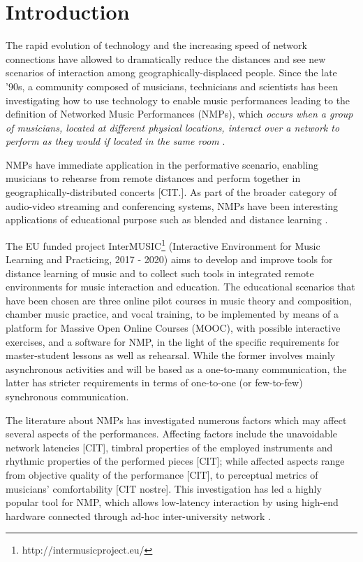 
\section{Introduction}\label{sec:introduction}

The rapid evolution of technology and the increasing speed of network connections have allowed to dramatically reduce the distances and see new scenarios of interaction among geogra\-phically-displaced people. Since the late '90s, a community composed of musicians, technicians and  scientists has been investigating how to use technology to enable music performances leading to the definition of Networked Music Performances (NMPs), which \textit{occurs when a group of musicians, located at different physical locations, interact over a network to perform as they would if located in the same room} \cite{Lazzaro2001}.

NMPs have immediate application in the performative scenario, enabling musicians to rehearse from remote distances and perform together in geographically-distributed concerts [CIT.]. As part of the broader category of audio-video streaming and conferencing systems, NMPs have been interesting applications of educational purpose such as blended and distance learning \cite{IorwerthNMP2015}.    


The EU funded project InterMUSIC\footnote{http://intermusicproject.eu/} (Interactive Environment for Music Learning and Practicing, 2017 - 2020) aims to develop and improve tools for distance learning of music and to collect such tools in integrated remote environments for music interaction and education. The educational scenarios that have been chosen are three online pilot courses in music theory and composition, chamber music practice, and vocal training, to be implemented by means of a platform for Massive Open Online Courses (MOOC), with possible interactive exercises, and a software for NMP, in the light of the specific requirements for master-student lessons as well as rehearsal. While the former involves mainly asynchronous activities and will be based as a one-to-many communication, the latter has stricter requirements in terms of one-to-one (or few-to-few) synchronous communication. 

The literature about NMPs has investigated numerous factors which may affect several aspects of the performances. Affecting factors include the unavoidable network latencies [CIT], timbral properties of the employed instruments and rhythmic properties of the performed pieces [CIT]; while affected aspects range from objective quality of the performance [CIT], to perceptual metrics of musicians' comfortability [CIT nostre]. This investigation has led a highly popular tool for NMP, which allows low-latency interaction by using high-end hardware connected through ad-hoc inter-university network \cite{drioli2013networked}. 

